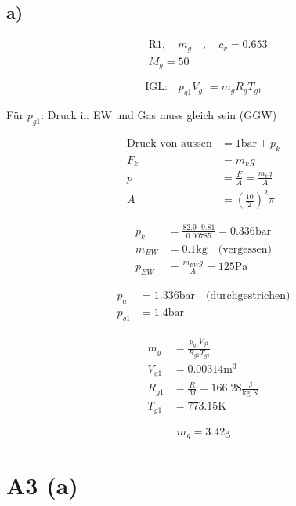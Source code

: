 

\subsection*{a)}

\begin{align*}
&\text{R}1, \quad m_{g} \quad , \quad c_{v} = 0.653 \\
&M_{g} = 50
\end{align*}

\begin{equation*}
\text{IGL:} \quad p_{g1} V_{g1} = m_{g} R_{g} T_{g1}
\end{equation*}

Für $p_{g1}$: Druck in EW und Gas muss gleich sein (GGW)

\begin{align*}
\text{Druck von aussen} &= 1 \text{bar} + p_{k} \\
F_{k} &= m_{k} g \\
p &= \frac{F}{A} = \frac{m_{k} g}{A} \\
A &= \left( \frac{10}{2} \right)^2 \pi
\end{align*}

\begin{align*}
p_{k} &= \frac{82.9 \cdot 9.81}{0.00785} = 0.336 \text{bar} \\
m_{EW} &= 0.1 \text{kg} \quad \text{(vergessen)} \\
p_{EW} &= \frac{m_{EW} g}{A} = 125 \text{Pa}
\end{align*}

\begin{align*}
p_{a} &= 1.336 \text{bar} \quad \text{(durchgestrichen)} \\
p_{g1} &= 1.4 \text{bar}
\end{align*}

\begin{align*}
m_{g} &= \frac{p_{g1} V_{g1}}{R_{g1} T_{g1}} \\
V_{g1} &= 0.00314 \text{m}^3 \\
R_{g1} &= \frac{R}{M} = 166.28 \frac{\text{J}}{\text{kg K}} \\
T_{g1} &= 773.15 \text{K}
\end{align*}

\begin{equation*}
m_{g} = 3.42 \text{g}
\end{equation*}

\section*{A3 (a)}


